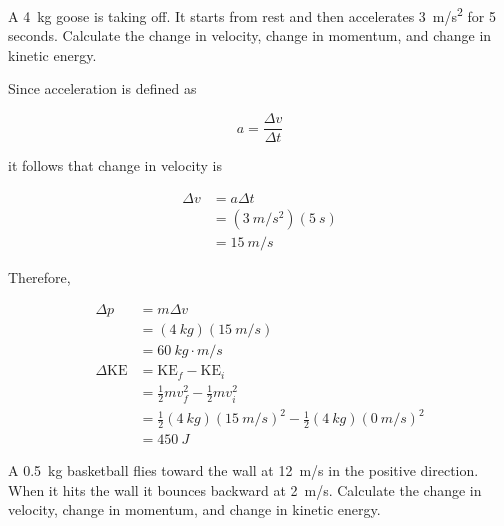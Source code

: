 \documentclass[../main-physics-problems.tex]{subfiles}
\begin{document}
\begin{questions}
\question 
A \SI{4}{kg} goose is taking off. It starts from rest and then accelerates \SI{3}{m/s^2} for 5 seconds. Calculate the change in velocity, change in momentum, and change in kinetic energy.

\begin{solution}
Since acceleration is defined as

\begin{equation*}
    a = \frac{\Delta v}{\Delta t}
\end{equation*}

it follows that change in velocity is

\vspace{-1em}
\begin{align*}
    \Delta v &= a \Delta t \\[1ex]
    &= (\SI{3}{m/s^2})(\SI{5}{s}) \\[1ex]
    &= \boxed{\SI{15}{m/s}}
\end{align*}
\vspace{-1em}

Therefore,

\begin{align*}
    \Delta p &= m \Delta v \\[1ex]
    &= (\SI{4}{kg})(\SI{15}{m/s}) \\[1ex]
    &= \boxed{\SI{60}{kg\cdot m/s}} \\[2ex]
    \Delta \mathrm{KE} &= \mathrm{KE}_f - \mathrm{KE}_i \\[1ex]
    &= \frac{1}{2}m v_f^2 - \frac{1}{2}mv_i^2 \\[1ex]
    &= \frac{1}{2}(\SI{4}{kg})(\SI{15}{m/s})^2 - \frac{1}{2}(\SI{4}{kg}) (\SI{0}{m/s})^2 \\[1ex]
    &= \boxed{\SI{450}{J}}
\end{align*}
\end{solution}


\ifprintanswers
    \clearpage
\fi

\question
A \SI{0.5}{kg} basketball flies toward the wall at \SI{12}{m/s} in the positive direction. When it hits the wall it bounces backward at \SI{2}{m/s}. Calculate the change in velocity, change in momentum, and change in kinetic energy. 


\end{questions}
\end{document}
